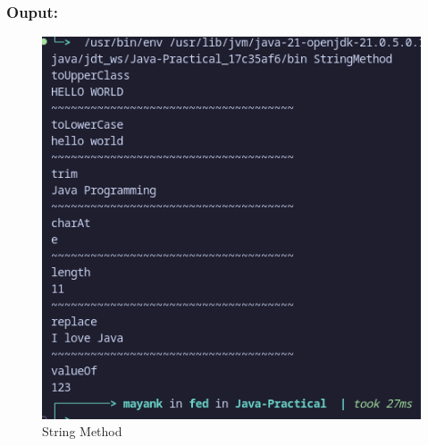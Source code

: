 \documentclass[a4paper,12pt]{article}
\begin{document}
\subsubsection{Ouput:}
\begin{figure}[H]
    \centering
    \includegraphics[width=0.8\linewidth]{images/StringMethod.png}
    \caption{String Method}
\end{figure}
\end{document}
